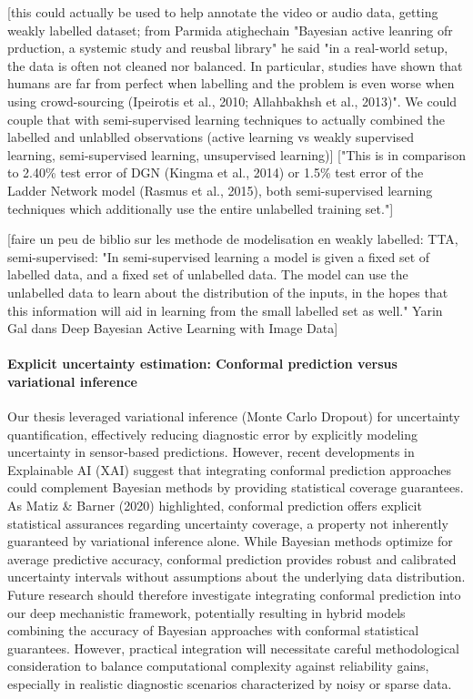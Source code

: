 [this could actually be used to help annotate the video or audio data, getting weakly labelled dataset; from Parmida atighechain "Bayesian active leanring ofr prduction, a systemic study and reusbal library" he said "in a real-world setup, the data is often not cleaned nor balanced. In particular, studies have shown that humans are far from perfect when labelling and the problem is even worse when using crowd-sourcing (Ipeirotis et al., 2010; Allahbakhsh et al., 2013)". We could couple that with semi-supervised learning techniques to actually combined the labelled and unlablled observations (active learning vs weakly supervised learning, semi-supervised learning, unsupervised learning)]
["This is in comparison to 2.40\% test error of DGN (Kingma et al., 2014) or 1.5\% test error of the Ladder Network model (Rasmus et al., 2015), both semi-supervised learning techniques which additionally use the entire unlabelled training set."]

[faire un peu de biblio sur les methode de modelisation en weakly labelled: TTA, semi-supervised: "In semi-supervised learning a model is given a fixed set of labelled data, and a fixed set of unlabelled data. The model can use the unlabelled data to learn about the distribution of the inputs, in the hopes that this information will aid in learning from the small labelled set as well." Yarin Gal dans Deep Bayesian Active Learning with Image Data]


\paragraph{Explicit uncertainty estimation: Conformal prediction versus variational inference} Our thesis leveraged variational inference (Monte Carlo Dropout) for uncertainty quantification, effectively reducing diagnostic error by explicitly modeling uncertainty in sensor-based predictions. However, recent developments in Explainable AI (XAI) suggest that integrating conformal prediction approaches could complement Bayesian methods by providing statistical coverage guarantees. As Matiz \& Barner (2020) highlighted, conformal prediction offers explicit statistical assurances regarding uncertainty coverage, a property not inherently guaranteed by variational inference alone. While Bayesian methods optimize for average predictive accuracy, conformal prediction provides robust and calibrated uncertainty intervals without assumptions about the underlying data distribution. Future research should therefore investigate integrating conformal prediction into our deep mechanistic framework, potentially resulting in hybrid models combining the accuracy of Bayesian approaches with conformal statistical guarantees. However, practical integration will necessitate careful methodological consideration to balance computational complexity against reliability gains, especially in realistic diagnostic scenarios characterized by noisy or sparse data.



